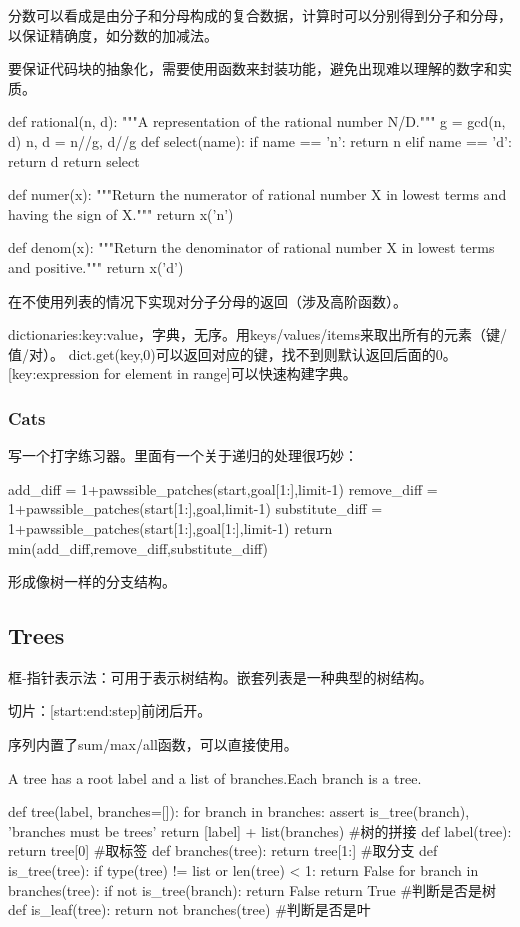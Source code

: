 \documentclass{ctexart}
\begin{document}
分数可以看成是由分子和分母构成的复合数据，计算时可以分别得到分子和分母，以保证精确度，如分数的加减法。

要保证代码块的抽象化，需要使用函数来封装功能，避免出现难以理解的数字和实质。
\begin{python}
    def rational(n, d):
    """A representation of the rational number N/D."""
    g = gcd(n, d)
    n, d = n//g, d//g
    def select(name):
        if name == 'n':
            return n
        elif name == 'd':
            return d
    return select

def numer(x):
    """Return the numerator of rational number X in lowest terms and having
    the sign of X."""
    return x('n')

def denom(x):
    """Return the denominator of rational number X in lowest terms and positive."""
    return x('d')
\end{python}
在不使用列表的情况下实现对分子分母的返回（涉及高阶函数）。

dictionaries:{key:value}，字典，无序。用keys/values/items来取出所有的元素（键/值/对）。
dict.get(key,0)可以返回对应的键，找不到则默认返回后面的0。
[key:expression for element in range]可以快速构建字典。

\subsubsection{Cats}

写一个打字练习器。里面有一个关于递归的处理很巧妙：
\begin{python}
        add_diff = 1+pawssible_patches(start,goal[1:],limit-1)
        remove_diff = 1+pawssible_patches(start[1:],goal,limit-1)
        substitute_diff = 1+pawssible_patches(start[1:],goal[1:],limit-1)
        return min(add_diff,remove_diff,substitute_diff)
\end{python}
形成像树一样的分支结构。

\subsection{Trees}

框-指针表示法：可用于表示树结构。嵌套列表是一种典型的树结构。

切片：[start:end:step]前闭后开。

序列内置了sum/max/all函数，可以直接使用。

A tree has a root label and a list of branches.Each branch is a tree. 
\begin{python}
def tree(label, branches=[]):
    for branch in branches:
        assert is_tree(branch), 'branches must be trees'
    return [label] + list(branches)
#树的拼接
def label(tree):
    return tree[0]
#取标签
def branches(tree):
    return tree[1:]
#取分支
def is_tree(tree):
    if type(tree) != list or len(tree) < 1:
        return False
    for branch in branches(tree):
        if not is_tree(branch):
            return False
    return True
#判断是否是树
def is_leaf(tree):
    return not branches(tree)
#判断是否是叶
\end{python}
\end{document}
